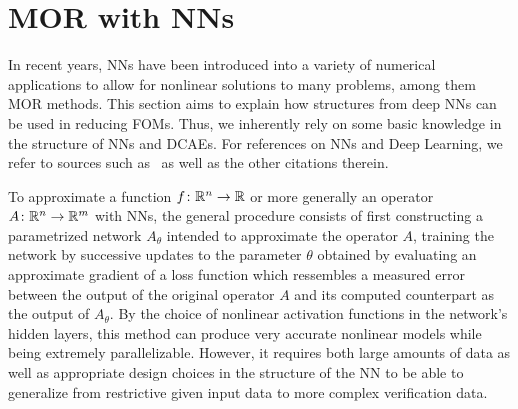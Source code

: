 \section{MOR with \aclp{NN}}\label{sec:nn-mor}

In recent years, \acp{NN} have been introduced into a variety of numerical applications to allow for nonlinear solutions to many problems, among them \ac{MOR} methods.
This section aims to explain how structures from deep \acp{NN} can be used in reducing \acp{FOM}.
Thus, we inherently rely on some basic knowledge in the structure of \acp{NN} and \acp{DCAE}.
For references on \acp{NN} and Deep Learning, we refer to sources such as~\cite{Goodfellow2016, Kubat2017, Sarker2021} as well as the other citations therein.

To approximate a function $f \colon \mathbb{R}^n \to \mathbb{R}$ or more generally an operator $A \colon \mathbb{R}^n \to \mathbb{R}^m$ with \acp{NN}, the general procedure consists of first constructing a parametrized network $A_\theta$ intended to approximate the operator $A$, training the network by successive updates to the parameter $\theta$ obtained by evaluating an approximate gradient of a loss function which ressembles a measured error between the output of the original operator $A$ and its computed counterpart as the output of $A_\theta$.
By the choice of nonlinear activation functions in the network's hidden layers, this method can produce very accurate nonlinear models while being extremely parallelizable.
However, it requires both large amounts of data as well as appropriate design choices in the structure of the \ac{NN} to be able to generalize from restrictive given input data to more complex verification data.

